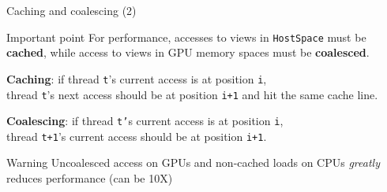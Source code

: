 \begin{frame}[fragile]{Caching and coalescing (2)}

  \begin{block}{Important point}
    For performance, accesses to views in \texttt{HostSpace} must be \textbf{cached}, while access to views in GPU memory spaces must be \textbf{coalesced}.
  \end{block}

  \vspace{5pt}

  \textbf{Caching}: if thread \texttt{t}'s current access is at position \texttt{i}, \\
  \hspace{20pt} thread \texttt{t}'s next access should be at position \texttt{i+1} and hit the same cache line.

  \vspace{5pt}

  \textbf{Coalescing}: if thread \texttt{t'}s current access is at position \texttt{i}, \\
  \hspace{20pt} thread \texttt{t+1}'s current access should be at position \texttt{i+1}.

  \pause

  \begin{alertblock}{Warning}
    Uncoalesced access on GPUs and non-cached loads on CPUs \emph{greatly} reduces performance (can be 10X)
  \end{alertblock}

\end{frame}



